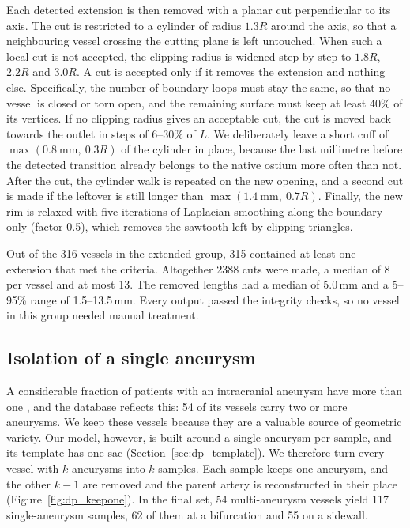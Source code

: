 Each detected extension is then removed with a planar cut perpendicular to its axis. The cut is restricted to a cylinder of radius $1.3R$ around the axis, so that a neighbouring vessel crossing the cutting plane is left untouched. When such a local cut is not accepted, the clipping radius is widened step by step to $1.8R$, $2.2R$ and $3.0R$. A cut is accepted only if it removes the extension and nothing else. Specifically, the number of boundary loops must stay the same, so that no vessel is closed or torn open, and the remaining surface must keep at least 40\% of its vertices. If no clipping radius gives an acceptable cut, the cut is moved back towards the outlet in steps of 6--30\% of $L$. We deliberately leave a short cuff of $\max(0.8\ \text{mm},\ 0.3R)$ of the cylinder in place, because the last millimetre before the detected transition already belongs to the native ostium more often than not. After the cut, the cylinder walk is repeated on the new opening, and a second cut is made if the leftover is still longer than $\max(1.4\ \text{mm},\ 0.7R)$. Finally, the new rim is relaxed with five iterations of Laplacian smoothing along the boundary only (factor 0.5), which removes the sawtooth left by clipping triangles.

Out of the 316 vessels in the extended group, 315 contained at least one extension that met the criteria. Altogether 2388 cuts were made, a median of 8 per vessel and at most 13. The removed lengths had a median of 5.0\,mm and a 5--95\% range of 1.5--13.5\,mm. Every output passed the integrity checks, so no vessel in this group needed manual treatment.

\subsection{Isolation of a single aneurysm}
\label{sec:dp_keepone}

A considerable fraction of patients with an intracranial aneurysm have more than one \citep{juvela2000}, and the database reflects this: 54 of its vessels carry two or more aneurysms. We keep these vessels because they are a valuable source of geometric variety. Our model, however, is built around a single aneurysm per sample, and its template has one sac (Section~\ref{sec:dp_template}). We therefore turn every vessel with $k$ aneurysms into $k$ samples. Each sample keeps one aneurysm, and the other $k-1$ are removed and the parent artery is reconstructed in their place (Figure~\ref{fig:dp_keepone}). In the final set, 54 multi-aneurysm vessels yield 117 single-aneurysm samples, 62 of them at a bifurcation and 55 on a sidewall.

